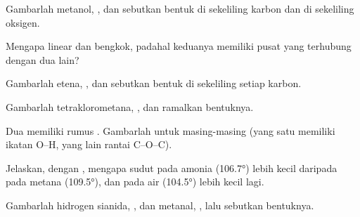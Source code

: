 \begin{exercise}[$\star\star$]\label{exo:g10:lewis-and-shape:8}
Gambarlah  metanol, , dan sebutkan bentuk di
sekeliling karbon dan di sekeliling oksigen.
\end{exercise}

\begin{exercise}[$\star\star$]\label{exo:g10:lewis-and-shape:9}
Mengapa  linear dan  bengkok, padahal keduanya memiliki
 pusat yang terhubung dengan dua  lain?
\end{exercise}

\begin{exercise}[$\star\star$]\label{exo:g10:lewis-and-shape:10}
Gambarlah  etena, , dan sebutkan bentuk di
sekeliling setiap  karbon.
\end{exercise}

\begin{exercise}[$\star\star$]\label{exo:g10:lewis-and-shape:11}
Gambarlah  tetraklorometana, , dan ramalkan
bentuknya.
\end{exercise}

\begin{exercise}[$\star\star\star$]\label{exo:g10:lewis-and-shape:12}
Dua  memiliki rumus . Gambarlah  untuk
masing-masing (yang satu memiliki ikatan O--H, yang lain rantai C--O--C).
\end{exercise}

\begin{exercise}[$\star\star\star$]\label{exo:g10:lewis-and-shape:13}
Jelaskan, dengan , mengapa sudut pada amonia (\ang{106.7})
lebih kecil daripada pada metana (\ang{109.5}), dan pada air
(\ang{104.5}) lebih kecil lagi.
\end{exercise}

\begin{exercise}[$\star\star\star$]\label{exo:g10:lewis-and-shape:14}
Gambarlah  hidrogen sianida, , dan metanal,
, lalu sebutkan bentuknya.
\end{exercise}

